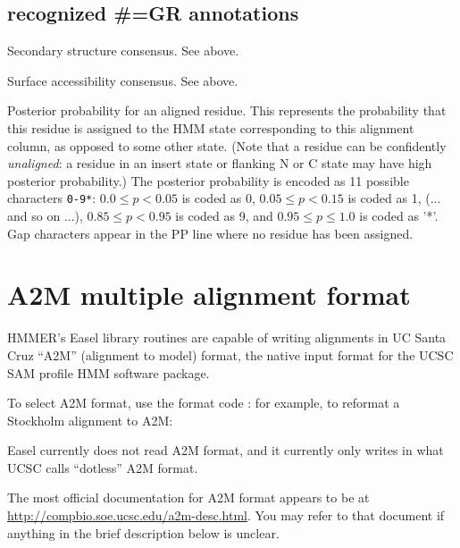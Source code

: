 \subsection{recognized \#=GR annotations}
\begin{sreitems}{}
\item [\monob{SS}]
        Secondary structure consensus. See  above.
\item [\monob{SA}]
        Surface accessibility consensus. See  above.
\item [\monob{PP}] Posterior probability for an aligned residue. This
  represents the probability that this residue is assigned to the HMM
  state corresponding to this alignment column, as opposed to some
  other state. (Note that a residue can be confidently
  \emph{unaligned}: a residue in an insert state or flanking N or C
  state may have high posterior probability.) The posterior
  probability is encoded as 11 possible characters \verb+0-9*+: $0.0
  \leq p < 0.05$ is coded as 0, $0.05 \leq p < 0.15$ is coded as 1,
  (... and so on ...), $0.85 \leq p < 0.95$ is coded as 9, and $0.95
  \leq p \leq 1.0$ is coded as '*'. Gap characters appear in the PP
  line where no residue has been assigned.
\end{sreitems}



\section{A2M multiple alignment format}

HMMER's Easel library routines are capable of writing alignments in UC
Santa Cruz ``A2M'' (alignment to model) format, the native input
format for the UCSC SAM profile HMM software package. 

To select A2M format, use the format code : for example, 
to reformat a Stockholm alignment to A2M:


Easel currently does not read A2M format, and it currently only writes
in what UCSC calls ``dotless'' A2M format.

The most official documentation for A2M format appears to be at
\url{http://compbio.soe.ucsc.edu/a2m-desc.html}. You may refer to that
document if anything in the brief description below is unclear.

